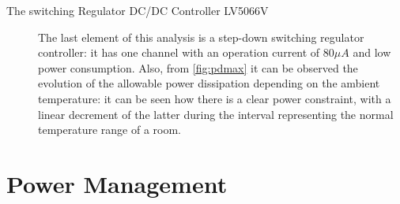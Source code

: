 \documentclass[11pt,a4paper,titlepage]{article}
\begin{document}
\begin{description}
          \item[The switching Regulator DC/DC Controller LV5066V] The last element of this analysis is a step-down switching regulator controller: it has one channel with an operation current of 80$\mu A$ and low power consumption. Also, from \autoref{fig:pdmax} it can be observed the evolution of the allowable power dissipation depending on the ambient temperature: it can be seen how there is a clear power constraint, with a linear decrement of the latter during the interval representing the normal temperature range of a room.

        \end{description}

				\section{Power Management} \label{sec:power_management}
\end{document}

